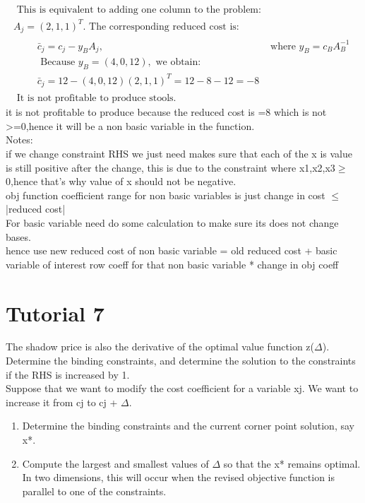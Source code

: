 \documentclass{article}
\begin{document}
$$
\begin{array} { l } { \text { This is equivalent to adding one column to the problem: } } \\ { A _ { j } = ( 2,1,1 ) ^ { T } . \text { The corresponding reduced cost is: } } \\ { \qquad \begin{aligned} \bar { c } _ { j } = c _ { j } - y _ { B } A _ { j } , & \text { where } y _ { B } = c _ { B } A _ { B } ^ { - 1 } \\ \text { Because } y _ { B } = ( 4,0,12 ) , \text { we obtain: } \\ \bar { c } _ { j } = 12 - ( 4,0,12 ) ( 2,1,1 ) ^ { T } = 12 - 8 - 12 = - 8 \end{aligned} } \\ { \text { It is not profitable to produce stools. } } \end{array}
$$
it is not profitable to produce because the reduced cost is =8 which is not >=0,hence it will be a non basic variable in the function.\\
Notes:\\
if we change constraint RHS we just need makes sure that each of the x is value is still positive after the change, this is due to the constraint where x1,x2,x3$\geq$0,hence that's why value of x should not be negative.\\
obj function coefficient range for non basic variables is just change in cost $\leq$ |reduced cost|\\
For basic variable need do some calculation to make sure its does not change bases.\\
hence use new reduced cost of non basic variable = old reduced cost + basic variable of interest row coeff for that non basic variable * change in obj coeff\\

\section{Tutorial 7}
The shadow price is also the derivative of the optimal value function z($\Delta$).\\
Determine the binding constraints, and determine the solution to the constraints if the RHS is increased by 1. \\
Suppose that we want to modify the cost coefficient for a variable xj.  We want to increase it from cj to cj + $\Delta$.
\begin{enumerate}
  \item Determine the binding constraints and the current corner point solution, say x*.
  \item Compute the largest and smallest values of $\Delta$ so that the x* remains optimal.  In two dimensions, this will occur when the revised objective function is parallel to one of the constraints.
\end{enumerate}
\end{document}
